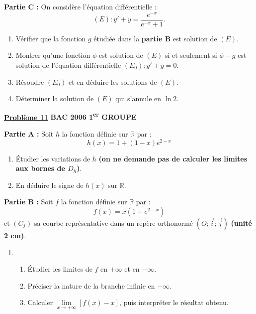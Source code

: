 \documentclass[12pt,a4paper]{article}
\newcommand{\exo}[1]{%
        \textbf{\underline{Problème #1}}
}
\begin{document}
\begin{multicols}{2}
\begin{enumerate}
\end{enumerate}
\textbf{Partie C :} On considère l’équation différentielle :
\[
(E) : y' + y = \dfrac{e^{-x}}{e^{-x} + 1}.
\]

\begin{enumerate}
    \item Vérifier que la fonction \( g \) étudiée dans la \textbf{partie B} est solution de \( (E) \).

    \item Montrer qu’une fonction \( \phi \) est solution de \( (E) \) si et seulement si \( \phi - g \) est solution de l’équation différentielle \( (E_0) : y' + y = 0 \).

    \item Résoudre \( (E_0) \) et en déduire les solutions de \( (E) \).

    \item Déterminer la solution de \( (E) \) qui s’annule en \( \ln 2 \).
\end{enumerate}

\exo{11} \textbf{BAC 2006 1\textsuperscript{er} GROUPE}

\textbf{Partie A :} Soit \( h \) la fonction définie sur \( \mathbb{R} \) par :
\[
h(x) = 1 + (1 - x)e^{2 - x}
\]

\begin{enumerate}
    \item Étudier les variations de \( h \) \textbf{(on ne demande pas de calculer les limites aux bornes de \( D_h \))}.
    \item En déduire le signe de \( h(x) \) sur \( \mathbb{R} \).
\end{enumerate}

\textbf{Partie B :} Soit \( f \) la fonction définie sur \( \mathbb{R} \) par :
\[
f(x) = x(1 + e^{2 - x})
\]
et \( (C_f) \) sa courbe représentative dans un repère orthonormé \( (O ; \vec{i} ; \vec{j}) \) \textbf{(unité 2 cm)}.

\begin{enumerate}
    \item 
    \begin{enumerate}
        \item Étudier les limites de \( f \) en \( +\infty \) et en \( -\infty \).
        \item Préciser la nature de la branche infinie en \( -\infty \).
                \item Calculer \( \lim\limits_{x \to +\infty} \left[ f(x) - x \right] \), puis interpréter le résultat obtenu.


\end{enumerate}
\end{enumerate}
\end{multicols}
\end{document}
